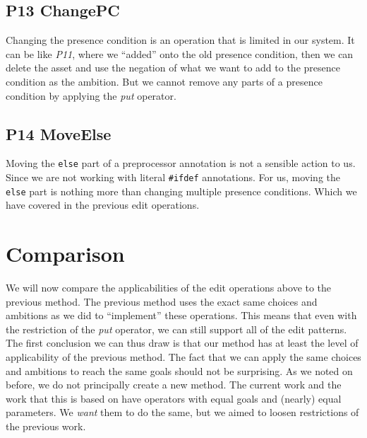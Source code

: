 \subsection*{P13 ChangePC}
Changing the presence condition is an operation that is limited in our system.
It can be like \emph{P11}, where we ``added'' onto the old presence condition,
then we can delete the asset and use the negation of what we want to add to
the presence condition as the ambition. But we cannot remove any parts of a
presence condition by applying the \emph{put} operator.

\subsection*{P14 MoveElse}
Moving the \texttt{else} part of a preprocessor annotation is not a sensible action
to us. Since we are not working with literal \texttt{\#ifdef} annotations. For
us, moving the \texttt{else} part is nothing more than changing multiple presence
conditions. Which we have covered in the previous edit operations.

\section{Comparison}
We will now compare the applicabilities of the edit operations above to the previous
method. The previous method uses the exact same choices and ambitions as we did to
``implement'' these operations. This means that even with the restriction of the
\emph{put} operator, we can still support all of the edit patterns. The first
conclusion we can thus draw is that our method has at least the level of applicability
of the previous method. The fact that we can apply the same choices and ambitions to
reach the same goals should not be surprising. As we noted on before, we do not
principally create a new method. The current work and the work that this is based on
have operators with equal goals and (nearly) equal parameters. We \emph{want} them to
do the same, but we aimed to loosen restrictions of the previous work. 

